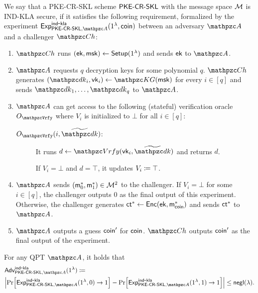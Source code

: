 \begin{definition}\label{def:IND-CPA_PKECRSKL}
We say that a PKE-CR-SKL scheme $\mathsf{PKE}\textrm{-}\mathsf{CR}\textrm{-}\mathsf{SKL}$  with the message space
$\mathcal{M}$ is IND-KLA secure, if it satisfies the following requirement,
formalized by the experiment
$\expb{\PKECRSKL,\qA}{ind}{kla}(1^\secp,\coin)$ between an adversary
$\qA$ and a challenger $\qCh$:
\begin{enumerate}
\item $\qCh$ runs $(\mathsf{ek},\mathsf{msk})\leftarrow\mathsf{Setup}(1^\lambda)$ and sends $\mathsf{ek}$
to $\qA$. 

\item $\qA$ requests $q$ decryption keys for some polynomial $q$.
$\qCh$ generates $(\qdk_i,\vk_i)\gets\qKG(\msk)$ for
every $i\in[q]$ and sends $\qdk_1,\ldots,\qdk_q$ to $\qA$.

\item $\qA$ can get access to the following (stateful) verification
oracle $\Oracle{\qVrfy}$ where $V_i$ is initialized to $\bot$ for all $i\in [q]$:

\begin{description}
\item[ $\Oracle{\qVrfy}(i,\widetilde{\qdk})$:] It runs $d \gets \qVrfy(\vk_i,\widetilde{\qdk})$ and returns $d$.  

If $V_i=\bot$ and $d=\top$, it updates $V_i\coloneqq \top$. 

\end{description}

\item $\qA$ sends $(\mathsf{m}_0^*,\mathsf{m}_1^*)\in \mathcal{M}^2$ to the challenger.
If $V_i=\bot$ for some $i\in[q]$, the challenger outputs $0$ as the
final output of this experiment. Otherwise, the challenger generates
$\mathsf{ct}^*\leftarrow\mathsf{Enc}(\mathsf{ek},\mathsf{m}_{\mathsf{coin}}^*)$ and sends $\mathsf{ct}^*$ to $\qA$.

\item $\qA$ outputs a guess $\mathsf{coin}^\prime$ for $\mathsf{coin}$. $\qCh$
outputs $\mathsf{coin}'$ as the final output of the experiment.

\end{enumerate}

For any QPT $\qA$, it holds that
\begin{align}
&\advb{\PKECRSKL,\qA}{ind}{kla}(1^\secp) \seteq \\
&\abs{\Pr[\expb{\PKECRSKL,\qA}{ind}{kla} (1^\secp,0) \ra 1] - \Pr[\expb{\PKECRSKL,\qA}{ind}{kla} (1^\secp,1) \ra 1] }\leq \negl(\secp).
\end{align}
\end{definition}


